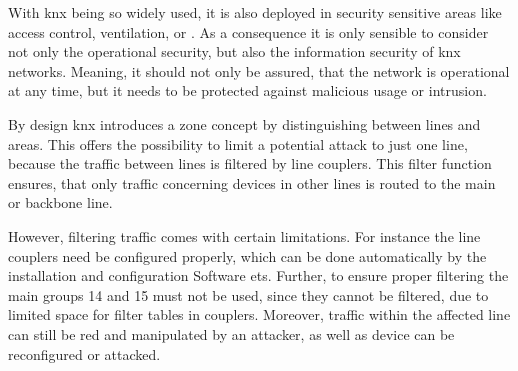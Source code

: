 With \gls{knx} being so widely used, it is also deployed in security sensitive areas like access control, ventilation, or .
As a consequence it is only sensible to consider not only the operational security, but also the information security of \gls{knx} networks. Meaning, it should not only be assured, that the network is operational at any time, but it needs to be protected against malicious usage or intrusion.

By design \gls{knx} introduces a zone concept by distinguishing between lines and areas.
This offers the possibility to limit a potential attack to just one line, because the traffic between lines is filtered by line couplers.
This filter function ensures, that only traffic concerning devices in other lines is routed to the main or backbone line.

However, filtering traffic comes with certain limitations. For instance the line couplers need be configured properly, which can be done automatically by the installation and configuration Software \gls{ets}. \parencite{Merz2009}
Further, to ensure proper filtering the main groups 14 and 15 must not be used, since they cannot be filtered, due to limited space for filter tables in couplers. \parencite{Hubner2009}
Moreover, traffic within the affected line can still be red and manipulated by an attacker, as well as device can be reconfigured or attacked.

